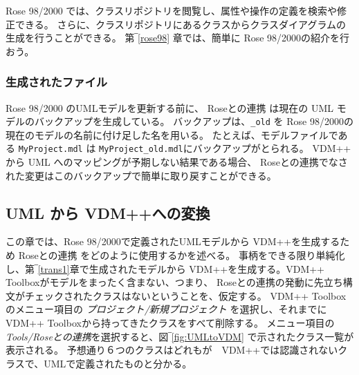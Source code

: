 \documentclass[\pformat,12pt]{jarticle}
\newcommand{\vdmpp}{VDM++}
\newcommand{\link}{Roseとの連携}
\newcommand{\rose}{Rose 98/2000}
\begin{document}
 \rose{} では、クラスリポジトリを閲覧し、属性や操作の定義を検索や修正できる。
 さらに、クラスリポジトリにあるクラスからクラスダイアグラムの生成を行うことができる。
第‾\ref{rose98} 章では、簡単に \rose{}の紹介を行おう。

\subsubsection*{生成されたファイル}

\rose{} のUMLモデルを更新する前に、 \link{} は現在の UML モデルのバックアップを生成している。
バックアップは、{\tt \_old} を \rose{}の現在のモデルの名前に付け足した名を用いる。
たとえば、モデルファイルである {\tt MyProject.mdl} は {\tt  MyProject\_old.mdl}にバックアップがとられる。
\vdmpp{} から UML へのマッピングが予期しない結果である場合、 \link{}でなされた変更はこのバックアップで簡単に取り戻すことができる。


\subsection{UML から VDM++への変換　} \label{trans2}
   

この章では、\rose{}で定義されたUMLモデルから \vdmpp{}を生成するため \link{} をどのように使用するかを述べる。
事柄をできる限り単純化し、第‾\ref{trans1}章で生成されたモデルから \vdmpp{}を生成する。\vdmpp{}　Toolboxがモデルをまったく含まない、つまり、 \link{}の発動に先立ち構文がチェックされたクラスはないということを、仮定する。
\vdmpp{} Toolboxのメニュー項目の {\it プロジェクト/新規プロジェクト} を選択し、それまでに\vdmpp{} Toolboxから持ってきたクラスをすべて削除する。
メニュー項目の {\it Tools/\link{}}を選択すると、図‾\ref{fig:UMLtoVDM} で示されたクラス一覧が表示される。
予想通り６つのクラスはどれもが　\vdmpp{}では認識されないクラスで、UMLで定義されたものと分かる。
\end{document}
